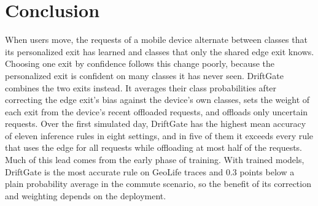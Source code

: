 \section{Conclusion}
\label{sec:conclusion}

When users move, the requests of a mobile device alternate between classes that its personalized exit has learned and classes that only the shared edge exit knows. Choosing one exit by confidence follows this change poorly, because the personalized exit is confident on many classes it has never seen. DriftGate combines the two exits instead. It averages their class probabilities after correcting the edge exit's bias against the device's own classes, sets the weight of each exit from the device's recent offloaded requests, and offloads only uncertain requests. Over the first simulated day, DriftGate has the highest mean accuracy of eleven inference rules in eight settings, and in five of them it exceeds every rule that uses the edge for all requests while offloading at most half of the requests. Much of this lead comes from the early phase of training. With trained models, DriftGate is the most accurate rule on GeoLife traces and 0.3 points below a plain probability average in the commute scenario, so the benefit of its correction and weighting depends on the deployment. 

